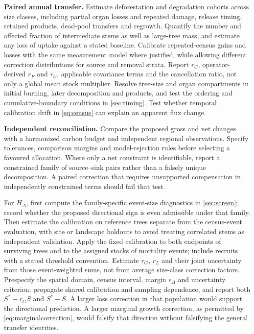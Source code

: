 \documentclass[11pt,a4paper]{article}
\theoremstyle{remark}
\begin{document}
\textbf{Paired annual transfer.} Estimate deforestation and degradation cohorts across size classes, including partial organ losses and repeated damage, release timing, retained products, dead-pool transfers and regrowth. Quantify the number and affected fraction of intermediate stems as well as large-tree mass, and estimate any loss of uptake against a stated baseline. Calibrate repeated-census gains and losses with the same measurement model where justified, while allowing different correction distributions for source and removal strata. Report $r_C$, operator-derived $r_F$ and $r_U$, applicable covariance terms and the cancellation ratio, not only a global mean stock multiplier. Resolve tree-size and organ compartments in initial burning, later decomposition and products, and test the ordering and cumulative-boundary conditions in \cref{sec:timing}. Test whether temporal calibration drift in \eqref{eq:census} can explain an apparent flux change.

\textbf{Independent reconciliation.} Compare the proposed gross and net changes with a harmonized carbon budget and independent regional observations. Specify tolerances, comparison margins and model-rejection rules before selecting a favoured allocation. Where only a net constraint is identifiable, report a constrained family of source--sink pairs rather than a falsely unique decomposition. A paired correction that requires unsupported compensation in independently constrained terms should fail that test.

For $H_\Delta$, first compute the family-specific event-size diagnostics in \cref{sec:screen}; record whether the proposed directional sign is even admissible under that family. Then estimate the calibration on reference trees separate from the census-event evaluation, with site or landscape holdouts to avoid treating correlated stems as independent validation. Apply the fixed calibration to both endpoints of surviving trees and to the assigned stocks of mortality events; include recruits with a stated threshold convention. Estimate $r_G$, $r_L$ and their joint uncertainty from those event-weighted sums, not from average size-class correction factors. Prespecify the spatial domain, census interval, margin $\epsilon_\Delta$ and uncertainty criterion; propagate shared calibration and sampling dependence, and report both $S^*-r_GS$ and $S^*-S$. A larger loss correction in that population would support the directional prediction. A larger marginal growth correction, as permitted by \eqref{eq:marginalcorrection}, would falsify that direction without falsifying the general transfer identities.
\end{document}
